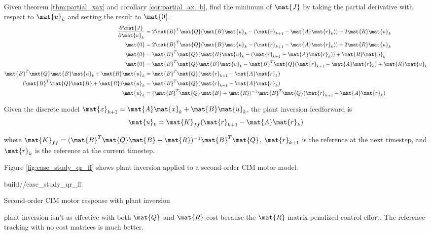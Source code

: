 Given theorem \ref{thm:partial_xax} and corollary \ref{cor:partial_ax_b}, find
the minimum of $\mat{J}$ by taking the partial derivative with respect to
$\mat{u}_k$ and setting the result to $\mat{0}$.
\begin{align*}
  \frac{\partial\mat{J}}{\partial\mat{u}_k} &= 2\mat{B}^T\mat{Q}
    (\mat{B}\mat{u}_k - (\mat{r}_{k+1} - \mat{A}\mat{r}_k)) +
    2\mat{R}\mat{u}_k \\
  \mat{0} &= 2\mat{B}^T\mat{Q}
    (\mat{B}\mat{u}_k - (\mat{r}_{k+1} - \mat{A}\mat{r}_k)) +
    2\mat{R}\mat{u}_k \\
  \mat{0} &= \mat{B}^T\mat{Q}
    (\mat{B}\mat{u}_k - (\mat{r}_{k+1} - \mat{A}\mat{r}_k)) +
    \mat{R}\mat{u}_k \\
  \mat{0} &= \mat{B}^T\mat{Q}\mat{B}\mat{u}_k -
    \mat{B}^T\mat{Q}(\mat{r}_{k+1} - \mat{A}\mat{r}_k) + \mat{R}\mat{u}_k \\
  \mat{B}^T\mat{Q}\mat{B}\mat{u}_k + \mat{R}\mat{u}_k &=
    \mat{B}^T\mat{Q}(\mat{r}_{k+1} - \mat{A}\mat{r}_k) \\
  (\mat{B}^T\mat{Q}\mat{B} + \mat{R})\mat{u}_k &=
    \mat{B}^T\mat{Q}(\mat{r}_{k+1} - \mat{A}\mat{r}_k) \\
  \mat{u}_k &= (\mat{B}^T\mat{Q}\mat{B} + \mat{R})^{-1}
    \mat{B}^T\mat{Q}(\mat{r}_{k+1} - \mat{A}\mat{r}_k)
\end{align*}
\begin{theorem}
  Given the discrete model
  $\mat{x}_{k+1} = \mat{A}\mat{x}_k + \mat{B}\mat{u}_k$, the plant inversion
  feedforward is
  \begin{equation*}
    \mat{u}_k = \mat{K}_{ff} (\mat{r}_{k+1} - \mat{A}\mat{r}_k)
  \end{equation*}

  where
  $\mat{K}_{ff} = (\mat{B}^T\mat{Q}\mat{B} + \mat{R})^{-1}\mat{B}^T\mat{Q}$,
  $\mat{r}_{k+1}$ is the reference at the next timestep, and $\mat{r}_k$ is the
  reference at the current timestep.
\end{theorem}

Figure \ref{fig:case_study_qr_ff} shows \gls{plant} inversion applied to a
second-order CIM motor model.
\begin{svg}{build/\partpath/case_study_qr_ff}
  \caption{Second-order CIM motor response with plant inversion}
  \label{fig:case_study_qr_ff}
\end{svg}

\Gls{plant} inversion isn't as effective with both $\mat{Q}$ and $\mat{R}$ cost
because the $\mat{R}$ matrix penalized \gls{control effort}. The \gls{reference}
\gls{tracking} with no cost matrices is much better.
